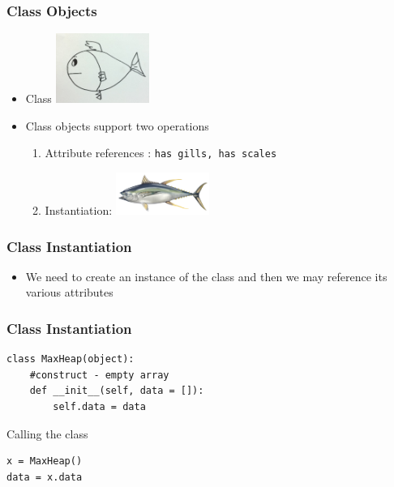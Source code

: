\documentclass{beamer}
\begin{document}
\begin{frame}
\frametitle{Class Objects}

 
\begin{itemize}
\item Class
\pause
\includegraphics[width=1.2in]{fish.jpg}
\pause
\item Class objects support two operations
\pause
\begin{enumerate}
\item Attribute references :  \pause \texttt{has gills, has scales}
\item Instantiation:  \pause \includegraphics[width=1.2in]{tuna.jpg}
\end{enumerate}

\end{itemize}




\end{frame}


\begin{frame}
\frametitle{Class Instantiation}

\begin{itemize}


\item We need to create an instance of the class and then we may reference its various attributes

\end{itemize}


\end{frame}



\begin{frame}[fragile]
\frametitle{Class Instantiation}



\begin{Verbatim}
class MaxHeap(object):
	#construct - empty array
	def __init__(self, data = []):
		self.data = data
\end{Verbatim}

Calling the class

\begin{Verbatim}
x = MaxHeap()
data = x.data
\end{Verbatim}
\end{frame}
\end{document}
